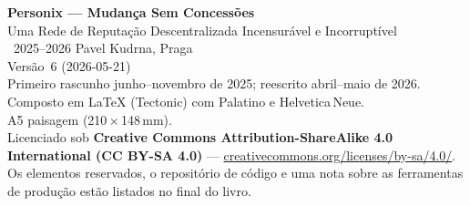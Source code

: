 \thispagestyle{empty}
\ifdefined\printmode\vspace*{\fill}\else{}\fi
\begin{flushleft}\small\sffamily
\textbf{Personix --- Mudança Sem Concessões}\\[0.3em]
Uma Rede de Reputação Descentralizada Incensurável e Incorruptível\\[1.4em]

\textcopyright\ 2025--2026 Pavel Kudrna, Praga\\[0.4em]

Versão~6 (2026-05-21)\\
Primeiro rascunho junho--novembro de 2025; reescrito abril--maio de 2026.\\[1.4em]

Composto em \LaTeX{} (Tectonic) com Palatino e Helvetica\,Neue.\\
A5 paisagem (210\,$\times$\,148\,mm).\\[1.4em]

Licenciado sob \textbf{Creative Commons Attribution-ShareAlike 4.0
International (CC BY-SA 4.0)} ---
\href{https://creativecommons.org/licenses/by-sa/4.0/}{creativecommons.org/licenses/by-sa/4.0/}.
Os elementos reservados, o repositório de código e uma nota sobre as ferramentas
de produção estão listados no final do livro.
\end{flushleft}
\ifdefined\printmode\else{}\fi
\clearpage
